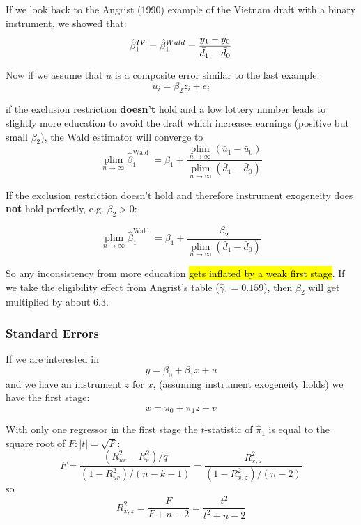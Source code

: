 \documentclass[11pt]{article}
\begin{document}
\begin{example}
    If we look back to the Angrist (1990) example of the Vietnam draft with a binary instrument, we showed that:
    \[\hat{\beta}_1^{IV} = \hat{\beta}_1^{Wald} = \dfrac{\bar{y}_1 - \Bar{y}_0}{\bar{d}_1 - \Bar{d}_0}\]

    Now if we assume that $u$ is a composite error similar to the last example:
    \[u_i = \beta_2 z_i + e_i\]

    if the exclusion restriction \textbf{doesn't} hold and a low lottery number leads to slightly more education to avoid the draft which increases earnings (positive but small $\beta_2$), the Wald estimator will converge to
    \begin{equation}
\underset{n \rightarrow \infty}{\operatorname{plim}} \hat{\beta}_1^{\text {Wald }}=\beta_1+\frac{\underset{n \rightarrow \infty}{\operatorname{plim}}\left(\bar{u}_1-\bar{u}_0\right)}{\underset{n \rightarrow \infty}{\operatorname{plim}}\left(\bar{d}_1-\bar{d}_0\right)}
\end{equation}

If the exclusion restriction doesn't hold and therefore instrument exogeneity does \textbf{not} hold perfectly, e.g. $\beta_2>0$:

\begin{equation}
\underset{n \rightarrow \infty}{\operatorname{plim}}\hat{\beta}_1^{\text {Wald }}=\beta_1+\frac{\beta_2}{\underset{n \rightarrow \infty}{\operatorname{plim}}\left(\bar{d}_1-\bar{d}_0\right)}
\end{equation}

So any inconsistency from more education \hl{gets inflated by a weak first stage}. If we take the eligibility effect from Angrist's table ($\hat{\gamma}_1 = 0.159$), then $\beta_2$ will get multiplied by about 6.3.
\end{example}

\subsubsection{Standard Errors}

If we are interested in 
\[y = \beta_0 + \beta_1 x + u\]
and we have an instrument $z$ for $x$, (assuming instrument exogeneity holds) we have the first stage:
\[x = \pi_0 + \pi_1 z + v\]

With only one regressor in the first stage the $t$-statistic of $\hat{\pi}_1$ is equal to the square root of $F: |t| = \sqrt{F}$:
\begin{equation}
F=\frac{\left(R_{u r}^2-R_r^2\right) / q}{\left(1-R_{u r}^2\right) /(n-k-1)}=\frac{R_{x, z}^2}{\left(1-R_{x, z}^2\right) /(n-2)}
\end{equation}
so
\begin{equation}
R_{x, z}^2=\frac{F}{F+n-2}=\frac{t^2}{t^2+n-2}
\end{equation}
\end{document}
